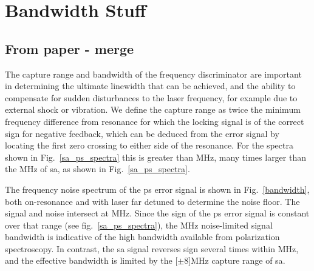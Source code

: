\section{Bandwidth Stuff}
\subsection{From paper - merge}
\label{bandwidth_section}
The capture range and bandwidth of the frequency discriminator are important in determining the ultimate linewidth that can be achieved, and the ability to compensate for sudden disturbances to the laser frequency, for example due to external shock or vibration.
We define the capture range as twice the minimum frequency difference from resonance for which the locking signal is of the correct sign for negative feedback, which can be deduced from the error signal by locating the first zero crossing to either side of the resonance.
For the spectra shown in Fig.~\ref{sa_ps_spectra} this is greater than \unit[300]{MHz}, many times larger than the \unit[16]{MHz} of \gls*{sa}, as shown in Fig.~\ref{sa_ps_spectra}.

The frequency noise spectrum of the \gls*{ps} error signal is shown in  Fig.~\ref{bandwidth}, both on-resonance and with laser far detuned to determine the noise floor.  The signal and noise intersect at \unit[83]{MHz}.
Since the sign of the \gls*{ps} error signal is constant over that range (see fig.~\ref{sa_ps_spectra}), the \unit[83]{MHz} noise-limited signal bandwidth is indicative of the high bandwidth available from polarization spectroscopy.
In contrast, the \gls*{sa} signal reverses sign several times within \unit[83]{MHz}, and the effective bandwidth is limited by the \unit[$\pm 8$]{MHz} capture range of \gls*{sa}.

